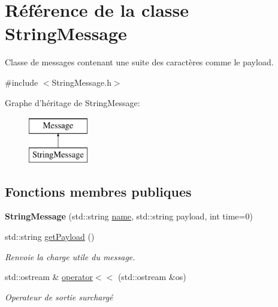 \hypertarget{classStringMessage}{\section{Référence de la classe String\-Message}
\label{classStringMessage}
}


Classe de messages contenant une suite des caractères comme le payload.  




{\ttfamily \#include $<$String\-Message.\-h$>$}

Graphe d'héritage de String\-Message\-:\begin{figure}[H]
\begin{center}
\leavevmode
\includegraphics[height=2.000000cm]{classStringMessage}
\end{center}
\end{figure}
\subsection*{Fonctions membres publiques}
\begin{DoxyCompactItemize}
\item 
\hypertarget{classStringMessage_a205d7c1d64055e34ecd2f3f6664c7e6c}{{\bfseries String\-Message} (std\-::string \hyperlink{classMessage_ac7adddb666acdc47c48f684bd6810a51}{name}, std\-::string payload, int time=0)}\label{classStringMessage_a205d7c1d64055e34ecd2f3f6664c7e6c}

\item 
\hypertarget{classStringMessage_a5c8be5fb2d2d9e78be4e1fc303624610}{std\-::string \hyperlink{classStringMessage_a5c8be5fb2d2d9e78be4e1fc303624610}{get\-Payload} ()}\label{classStringMessage_a5c8be5fb2d2d9e78be4e1fc303624610}

\begin{DoxyCompactList}\small\item\em Renvoie la charge utile du message. \end{DoxyCompactList}\item 
\hypertarget{classStringMessage_a0071398acab934eb263ca6892ea76a4c}{std\-::ostream \& \hyperlink{classStringMessage_a0071398acab934eb263ca6892ea76a4c}{operator$<$$<$} (std\-::ostream \&os)}\label{classStringMessage_a0071398acab934eb263ca6892ea76a4c}

\begin{DoxyCompactList}\small\item\em Operateur de sortie surchargé \end{DoxyCompactList}\end{DoxyCompactItemize}
